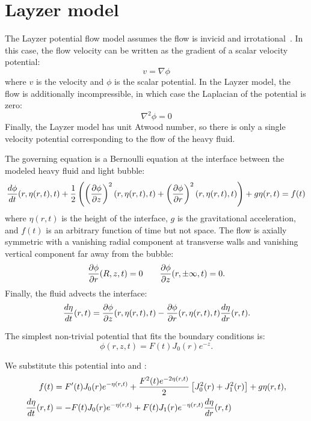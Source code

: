 \section{Layzer model} 

The Layzer potential flow model assumes the flow is invicid and irrotational~\cite{Layzer1955}.
In this case, the flow velocity can be written as the gradient of a scalar velocity potential:
\begin{equation}
v = \nabla \phi
\end{equation}
where 
$v$ is the velocity and 
$\phi$ is the scalar potential.
In the Layzer model, the flow is additionally incompressible, in which case the Laplacian of the potential is zero:
\begin{equation}
\nabla^2 \phi = 0
\end{equation}
Finally, the Layzer model has unit Atwood number, so there is only a single velocity potential corresponding to the flow of the heavy fluid.

The governing equation is a Bernoulli equation at the interface between the modeled heavy fluid and light bubble:
\begin{equation} \elabel{layzer_jump}
\der{\phi}{t}(r, \eta(r,t), t) + \frac{1}{2} \left(\left(\pder{\phi}{z}\right)^2(r, \eta(r,t), t) +\left(\pder{\phi}{r}\right)^2(r, \eta(r,t), t)\right) + g \eta(r,t) = f(t)
\end{equation}
where 
$\eta(r,t)$ is the height of the interface,
$g$ is the gravitational acceleration, and 
$f(t)$ is an arbitrary function of time but not space.
The flow is axially symmetric with a vanishing radial component at transverse walls and vanishing vertical component far away from the bubble:
\begin{equation}
\frac{\partial \phi}{\partial r}(R,z,t) = 0 \qquad \frac{\partial \phi}{\partial z}(r, \pm \infty, t) = 0 .
\end{equation}
Finally, the fluid advects the interface:
\begin{equation} \elabel{layzer_adv}
\der{\eta}{t}(r,t) = \pder{\phi}{z}(r, \eta(r,t), t) - \pder{\phi}{r}(r, \eta(r,t), t) \der{\eta}{r}(r,t).
\end{equation}

The simplest non-trivial potential that fits the boundary conditions is:
\begin{equation}
\phi(r,z,t) = F(t) J_0(r) e^{-z}.
\end{equation}

We substitute this potential into  and :
\begin{align}
f(t) &= F'(t) J_0(r) e^{-\eta(r,t)} + \frac{F^2(t) e^{-2\eta(r,t)}}{2} \left[ J_0^2(r)  + J_1^2(r) \right] + g \eta(r,t) ,\\
\frac{d \eta}{d t}(r,t) &=  -F(t) J_0(r)e^{-\eta(r,t)}  + F(t) J_1(r) e^{-\eta(r,t)} \frac{d \eta}{d r}(r,t)
\end{align}

